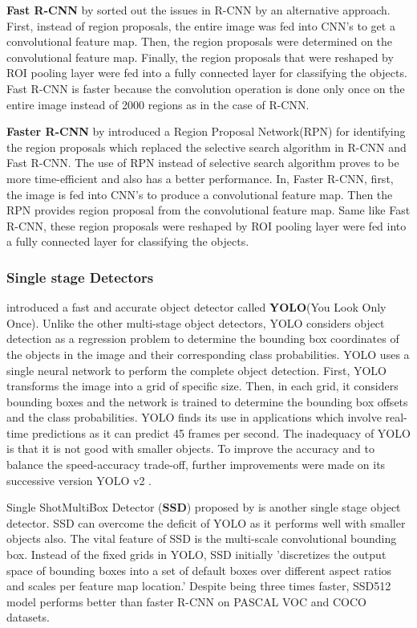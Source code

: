 \documentclass[thesis]{mas_proposal}
\begin{document}
\textbf{Fast R-CNN} by \citet{girshick2015fast} sorted out the issues in R-CNN by an alternative approach. First, instead of region proposals, the entire image was fed into CNN's to get a convolutional feature map. Then, the region proposals were determined on the convolutional feature map. Finally, the region proposals that were reshaped by ROI pooling layer were fed into a fully connected layer for classifying the objects. Fast R-CNN is faster because the convolution operation is done only once on the entire image instead of 2000 regions as in the case of R-CNN. 

\textbf{Faster R-CNN} by \citet{ren2015faster} introduced a Region Proposal Network(RPN) for identifying the region proposals which replaced the selective search algorithm in R-CNN and Fast R-CNN. The use of RPN instead of selective search algorithm proves to be more time-efficient and also has a better performance. In, Faster R-CNN, first, the image is fed into CNN's to produce a  convolutional feature map. Then the RPN provides region proposal from the convolutional feature map. Same like Fast R-CNN, these region proposals were reshaped by ROI pooling layer were fed into a fully connected layer for classifying the objects.

\subsubsection{Single stage Detectors}
\citet{redmon2016you} introduced a fast and accurate object detector called \textbf{YOLO}(You Look Only Once). Unlike the other multi-stage object detectors, YOLO considers object detection as a regression problem to determine the bounding box coordinates of the objects in the image and their corresponding class probabilities. YOLO uses a single neural network to perform the complete object detection. First, YOLO transforms the image into a grid of specific size. Then, in each grid, it considers bounding boxes and the network is trained to determine the bounding box offsets and the class probabilities. YOLO finds its use in applications which involve real-time predictions as it can predict 45 frames per second. The inadequacy of YOLO is that it is not good with smaller objects. To improve the accuracy and to balance the speed-accuracy trade-off, further improvements were made on its successive version YOLO v2 \cite{redmon2017yolo9000}. 

Single ShotMultiBox Detector (\textbf{SSD})  proposed by \citet{liu2016ssd} is another single stage object detector. SSD can overcome the deficit of YOLO as it performs well with smaller objects also. The vital feature of SSD is the multi-scale convolutional bounding box. Instead of the fixed grids in YOLO, SSD initially 'discretizes the output space of bounding boxes into a set of default boxes over different aspect ratios and scales per feature map location.'\cite{liu2016ssd} Despite being three times faster, SSD512 model performs better than faster R-CNN on PASCAL VOC and COCO datasets. 
\end{document}
